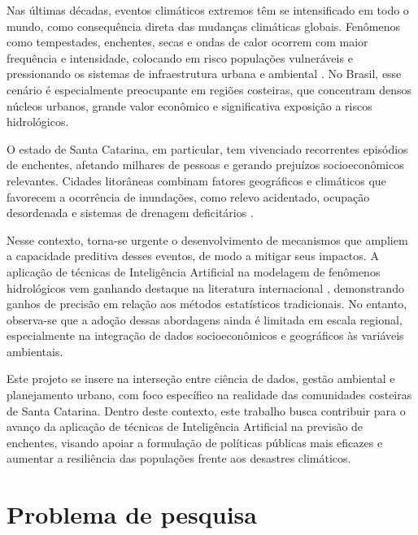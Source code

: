 
Nas últimas décadas, eventos climáticos extremos têm se intensificado em todo o mundo, como consequência direta das mudanças climáticas globais. Fenômenos como tempestades, enchentes, secas e ondas de calor ocorrem com maior frequência e intensidade, colocando em risco populações vulneráveis e pressionando os sistemas de infraestrutura urbana e ambiental \cite{ipcc2021}. No Brasil, esse cenário é especialmente preocupante em regiões costeiras, que concentram densos núcleos urbanos, grande valor econômico e significativa exposição a riscos hidrológicos.

O estado de Santa Catarina, em particular, tem vivenciado recorrentes episódios de enchentes, afetando milhares de pessoas e gerando prejuízos socioeconômicos relevantes. Cidades litorâneas combinam fatores geográficos e climáticos que favorecem a ocorrência de inundações, como relevo acidentado, ocupação desordenada e sistemas de drenagem deficitários \cite{ana2021}.

Nesse contexto, torna-se urgente o desenvolvimento de mecanismos que ampliem a capacidade preditiva desses eventos, de modo a mitigar seus impactos. A aplicação de técnicas de Inteligência Artificial na modelagem de fenômenos hidrológicos vem ganhando destaque na literatura internacional \cite{mosavi2018,zhang2019}, demonstrando ganhos de precisão em relação aos métodos estatísticos tradicionais. No entanto, observa-se que a adoção dessas abordagens ainda é limitada em escala regional, especialmente na integração de dados socioeconômicos e geográficos às variáveis ambientais.

Este projeto se insere na interseção entre ciência de dados, gestão ambiental e planejamento urbano, com foco específico na realidade das comunidades costeiras de Santa Catarina. Dentro deste contexto, este trabalho busca contribuir para o avanço da aplicação de técnicas de Inteligência Artificial na previsão de enchentes, visando apoiar a formulação de políticas públicas mais eficazes e aumentar a resiliência das populações frente aos desastres climáticos.

\section{Problema de pesquisa}
\label{sec:problema}

